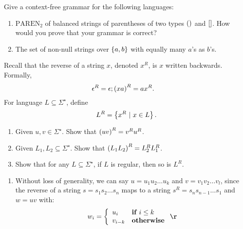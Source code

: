 \documentclass{article}
\begin{document}
\begin{exercise}
Give a context-free grammar for the following languages:
\begin{enumerate}
 \item $\mbox{PAREN}_2$ of balanced strings of parentheses of two types $\left(  \right)$ and $\left[  \right]$. How would you prove that your grammar is correct?
 \item The set of non-null strings over $\left\{ a,b \right\}$ with equally many $a$'s as $b$'s.
\end{enumerate}
\begin{answer}
\end{answer}
\end{exercise}
\begin{exercise}
Recall that the reverse of a string $x$, denoted $x^R$, is $x$ written backwards. Formally,
\begin{eqnarray}
\epsilon^R=\epsilon;&\left( xa \right)^R=ax^R.
\end{eqnarray}
For language $L\subseteq\Sigma^{\star}$, define
\begin{equation}
L^R=\left\{ x^R\ |\ x\in L \right\}.
\end{equation}
\begin{enumerate}
 \item Given $u,v\in\Sigma^{\star}$. Show that $\left( uv \right)^R=v^Ru^R$.
 \item Given $L_1,L_2\subseteq\Sigma^{\star}$. Show that $\left( L_1 L_2 \right)^R=L_2^RL_1^R$.
 \item Show that for any $L\subseteq\Sigma^{\star}$, if $L$ is regular, then so is $L^R$.
\end{enumerate}
\begin{answer}
\begin{enumerate}
 \item Without loss of generality, we can say $u=u_1u_2\ldots u_k$ and $v=v_1v_2\ldots v_l$, since the reverse of a string $s=s_1s_2\ldots s_n$ maps to a string $s^R=s_ns_{n-1}\ldots s_1$ and $w=uv$ with:
 \begin{equation}
  w_i=\acclguard{u_i&\xif i\leq k\\v_{i-k}&\xotherwise}\r
 \end{equation}


\end{enumerate}
\end{answer}
\end{exercise}
\end{document}
